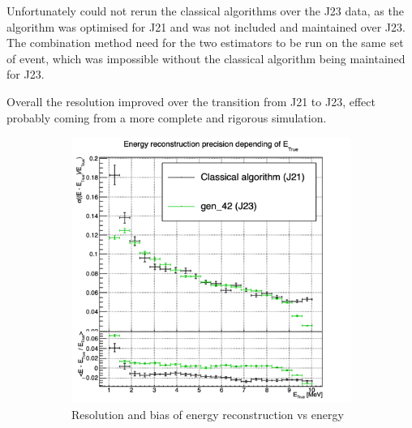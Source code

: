\documentclass[../main.tex]{subfiles}
\begin{document}
Unfortunately could not rerun the classical algorithms over the J23 data, as the algorithm was optimised for J21 and was not included and maintained over J23. The combination method need for the two estimators to be run on the same set of event, which was impossible without the classical algorithm being maintained for J23.

Overall the resolution improved over the transition from J21 to J23, effect probably coming from a more complete and rigorous simulation.
\begin{figure}[ht]
  \centering
  \begin{subfigure}[t]{0.32\linewidth}
    \centering
    \includegraphics[width=\linewidth]{images/jcnn/vic_cnn/multi_vic_42_MESBvETC.png}
    \caption{Resolution and bias of energy reconstruction vs energy}
    \label{fig:jcnn:vic_cnn:multi_vic_42_MESBvETC}
  \end{subfigure}
  \begin{subfigure}[t]{0.32\linewidth}
    \centering

\end{subfigure}
\end{figure}
\end{document}
